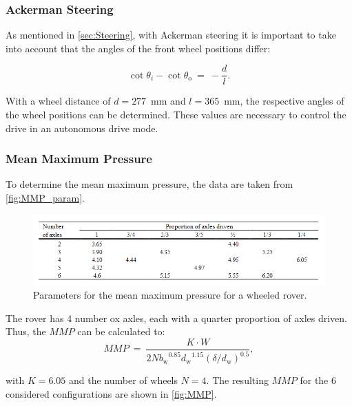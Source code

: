 \subsubsection*{Ackerman Steering}
\label{app:Ackerman}

As mentioned in \autoref{sec:Steering}, with Ackerman steering it is important to take into account that the angles of the front wheel positions differ: 

\begin{equation}
	\cot \theta_{i} - \cot \theta_\text{o} \:  = \:	- \frac{d}{l}	.
	\label{eq:Ackerman}
\end{equation}

With a wheel distance of \(d = 277\)~mm and \(l = 365\)~mm, the respective angles of the wheel positions can be determined. These values are necessary to control the drive in an autonomous drive mode.

\subsubsection*{Mean Maximum Pressure}
\label{app:MMP}

To determine the mean maximum pressure, the data are taken from \autoref{fig:MMP_param}. 

\begin{figure}[htb] 
  \centering
     \includegraphics[width=1\textwidth]{Media/MMP_Param.png}
  \caption{Parameters for the mean maximum pressure for a wheeled rover.}
  \label{fig:MMP_param}
\end{figure}

The rover has 4 number ox axles, each with a quarter proportion of axles driven. Thus, the \(MMP\) can be calculated to:
\begin{equation}
	MMP \:  = \: \frac{K \cdot W}{2N{b_\text{w}}^{0.85}{d_\text{w}}^{1.15} { \left( \delta / d_\text{w} \right) }^{0.5}}		,
	\label{eq:MMP}
\end{equation}

with \(K = 6.05\) and the number of wheels \(N=4\). The resulting \(MMP\) for the 6 considered configurations are shown in \autoref{fig:MMP}. 

